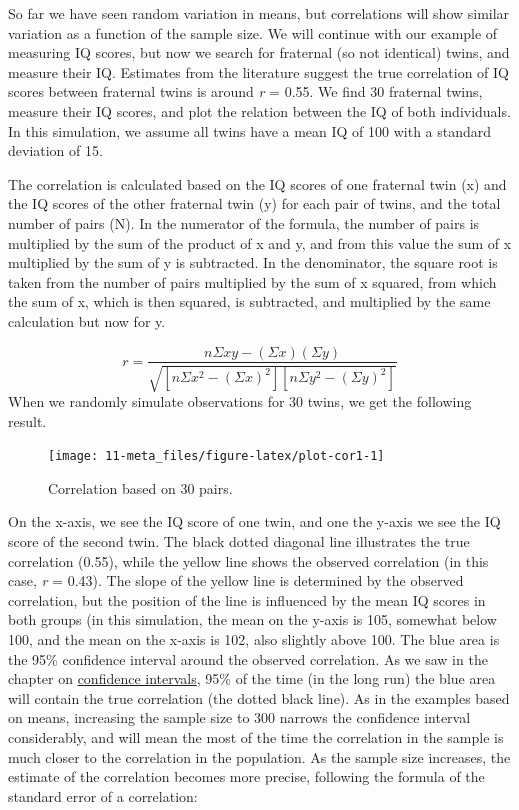 \documentclass[
  oneside]{book}
\begin{document}
So far we have seen random variation in means, but correlations will show similar variation as a function of the sample size. We will continue with our example of measuring IQ scores, but now we search for fraternal (so not identical) twins, and measure their IQ. Estimates from the literature suggest the true correlation of IQ scores between fraternal twins is around \emph{r} = 0.55. We find 30 fraternal twins, measure their IQ scores, and plot the relation between the IQ of both individuals. In this simulation, we assume all twins have a mean IQ of 100 with a standard deviation of 15.

The correlation is calculated based on the IQ scores of one fraternal twin (x) and the IQ scores of the other fraternal twin (y) for each pair of twins, and the total number of pairs (N). In the numerator of the formula, the number of pairs is multiplied by the sum of the product of x and y, and from this value the sum of x multiplied by the sum of y is subtracted. In the denominator, the square root is taken from the number of pairs multiplied by the sum of x squared, from which the sum of x, which is then squared, is subtracted, and multiplied by the same calculation but now for y.

\[r=\frac{n \Sigma x y-(\Sigma x )(\Sigma y)}{\sqrt{[n \Sigma x^{2}-(\Sigma x)^{2}][n \Sigma y^{2}-(\Sigma y)^{2}]}}\]
When we randomly simulate observations for 30 twins, we get the following result.



\begin{figure}

{\centering \texttt{[image: 11-meta\_files/figure-latex/plot-cor1-1]} 

}

\caption{Correlation based on 30 pairs.}\label{fig:plot-cor1}
\end{figure}

On the x-axis, we see the IQ score of one twin, and one the y-axis we see the IQ score of the second twin. The black dotted diagonal line illustrates the true correlation (0.55), while the yellow line shows the observed correlation (in this case, \emph{r} = 0.43). The slope of the yellow line is determined by the observed correlation, but the position of the line is influenced by the mean IQ scores in both groups (in this simulation, the mean on the y-axis is 105, somewhat below 100, and the mean on the x-axis is 102, also slightly above 100. The blue area is the 95\% confidence interval around the observed correlation. As we saw in the chapter on \protect\hyperlink{confint}{confidence intervals}, 95\% of the time (in the long run) the blue area will contain the true correlation (the dotted black line). As in the examples based on means, increasing the sample size to 300 narrows the confidence interval considerably, and will mean the most of the time the correlation in the sample is much closer to the correlation in the population. As the sample size increases, the estimate of the correlation becomes more precise, following the formula of the standard error of a correlation:
\end{document}
